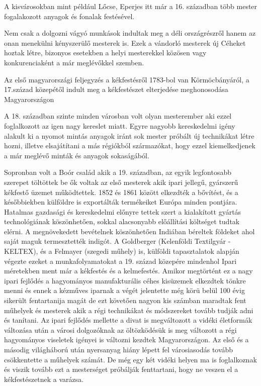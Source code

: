 A kisvárosokban mint például Lőcse, Eperjes itt már a 16. században több mester  fogalakozott anyagok és fonalak  festésével. 

Nem csak a dolgozni vágyó munkások indultak meg a déli országrészről hanem az onan menekülni kényszerülő mesterek is. Ezek a vándorló mesterek új Céheket hoztak létre, bizonyos esetekben a helyi mesterekkel közösen vagy konkurenciaként a már meglévőkkel szemben. 

Az első magyarországi feljegyzés a kékfestésről 1783-bol van Körmöcbányáról, a 17.század közepétől indult meg a kékfestészet elterjedése meghonosodása Magyarországon  %

A 18. században szinte minden városban volt olyan mesterember aki ezzel foglalkozott az igen nagy kereslet miatt. Egyre nagyobb kereskedelmi igény alakult ki a nyomot mintás anyagok iránt sok mester próbált új technikákat létre hozni, illetve  elsajátítani a más régiókból származókat, hogy ezzel kiemelkedjenek a már meglévő minták és anyagok sokaságából.

Sopronban volt a Boór család akik a 19. században, az egyik legfontosabb szerepet töltöttek be ők voltak az első mesterek akik ipari jellegű, gyárszerű  kékfestő üzemet működtettek.
1852 és 1861 között elkezdték a bővítést, és a későbbiekben külföldre is exportálták termékeiket Európa minden pontjára. Hatalmas gazdasági és kereskedelmi előnyre tettek szert a kialakított gyártás technológiának köszönhetően, sokkal alacsonyabb előállítási költséget tudtak elérni. A megnövekedett bevételnek köszönhetően Indiában béreltek földeket ahol saját maguk termesztették indigót.
A Goldberger (Kelenföldi Textilgyár - KELTEX), és a Felmayer (szegedi műhely) is, külföldi tapasztalatok alapján végezte ezeket a  munkafolyamatokat a 19. század közepére mindenhol Ipari méretekben ment már a kékfestés és a kelmefestés.
Amikor megtörtént ez a nagy ipari fejlődés a hagyományos manufakturális céhes kisüzemek elkezdtek tönkre menni és ennek a kézműves iparnak a végét jelentette még körü belül 100 évig sikerült fentartanija magát de ezt követően nagyon kis számban maradtak fent műhelyek és mesterek akik a régi technikákat és módszereket tovább tudják adni és tanítani.
Az ipari fejlődés mellette a divat is megváltozott a vidéki életformák változása után a városi dolgozóknak az öltözködésük is meg változott a régi hagyományos viseletek igényei is változni kezdtek Magyarországon.
Az első és a másodig világháború után nyersanyag hiány lépett fel városiasodás tovább csökkentette a műhelyek számát.
De még egy két vidéki helyen ma is foglalkoznak és viszik tovább ezt a mesterséget próbálják fenttartani, hogy ne veszen el a kékfestészetnek a varázsa.

